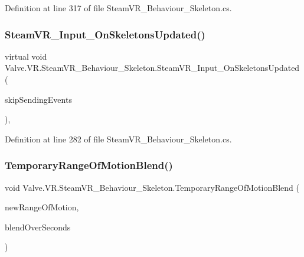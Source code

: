 Definition at line 317 of file Steam\+V\+R\+\_\+\+Behaviour\+\_\+\+Skeleton.\+cs.

\mbox{\label{class_valve_1_1_v_r_1_1_steam_v_r___behaviour___skeleton_aed98f569c32bea5ec03f97364d7374ee}} 
\subsubsection{\texorpdfstring{SteamVR\_Input\_OnSkeletonsUpdated()}{SteamVR\_Input\_OnSkeletonsUpdated()}}
{\footnotesize\ttfamily virtual void Valve.\+V\+R.\+Steam\+V\+R\+\_\+\+Behaviour\+\_\+\+Skeleton.\+Steam\+V\+R\+\_\+\+Input\+\_\+\+On\+Skeletons\+Updated (\begin{DoxyParamCaption}\item[{bool}]{skip\+Sending\+Events }\end{DoxyParamCaption})\hspace{0.3cm}{\ttfamily [protected]}, {\ttfamily [virtual]}}



Definition at line 282 of file Steam\+V\+R\+\_\+\+Behaviour\+\_\+\+Skeleton.\+cs.

\mbox{\label{class_valve_1_1_v_r_1_1_steam_v_r___behaviour___skeleton_a7c0e4152b182bad3055bf31434f4cb0d}} 
\subsubsection{\texorpdfstring{TemporaryRangeOfMotionBlend()}{TemporaryRangeOfMotionBlend()}}
{\footnotesize\ttfamily void Valve.\+V\+R.\+Steam\+V\+R\+\_\+\+Behaviour\+\_\+\+Skeleton.\+Temporary\+Range\+Of\+Motion\+Blend (\begin{DoxyParamCaption}\item[{\mbox{\hyperlink{namespace_valve_1_1_v_r_affc8d18345f8f5d36f1ae7b4ce534500}{E\+V\+R\+Skeletal\+Motion\+Range}}}]{new\+Range\+Of\+Motion,  }\item[{float}]{blend\+Over\+Seconds }\end{DoxyParamCaption})\hspace{0.3cm}{\ttfamily [protected]}}



